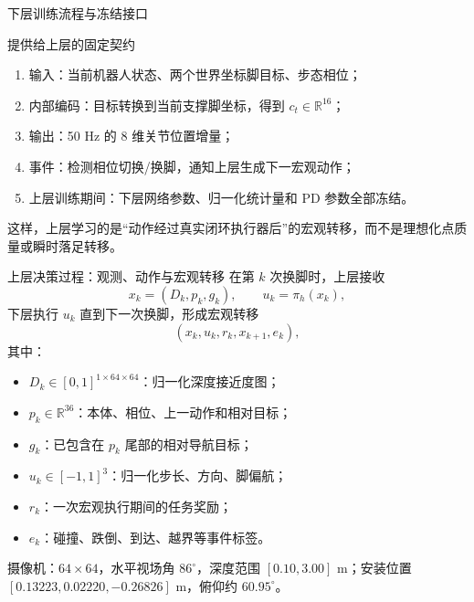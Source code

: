 \documentclass[aspectratio=169,10pt]{beamer}
\begin{document}
\begin{frame}{下层训练流程与冻结接口}
\centering
{}
\vspace{0.8em}
\begin{block}{提供给上层的固定契约}
\begin{enumerate}
  \item 输入：当前机器人状态、两个世界坐标脚目标、步态相位；
  \item 内部编码：目标转换到当前支撑脚坐标，得到 $c_t\in\mathbb{R}^{16}$；
  \item 输出：50 Hz 的 8 维关节位置增量；
  \item 事件：检测相位切换/换脚，通知上层生成下一宏观动作；
  \item 上层训练期间：下层网络参数、归一化统计量和 PD 参数全部冻结。
\end{enumerate}
\end{block}
这样，上层学习的是“动作经过真实闭环执行器后”的宏观转移，而不是理想化点质量或瞬时落足转移。
\end{frame}

\begin{frame}{上层决策过程：观测、动作与宏观转移}
\small
在第 $k$ 次换脚时，上层接收
\[
x_k=(D_k,p_k,g_k),\qquad u_k=\pi_h(x_k),
\]
下层执行 $u_k$ 直到下一次换脚，形成宏观转移
\[
(x_k,u_k,r_k,x_{k+1},e_k),
\]
其中：
\begin{itemize}
  \item $D_k\in[0,1]^{1\times64\times64}$：归一化深度接近度图；
  \item $p_k\in\mathbb{R}^{36}$：本体、相位、上一动作和相对目标；
  \item $g_k$：已包含在 $p_k$ 尾部的相对导航目标；
  \item $u_k\in[-1,1]^3$：归一化步长、方向、脚偏航；
  \item $r_k$：一次宏观执行期间的任务奖励；
  \item $e_k$：碰撞、跌倒、到达、越界等事件标签。
\end{itemize}
摄像机：$64\times64$，水平视场角 $86^\circ$，深度范围 $[0.10,3.00]$ m；安装位置 $[0.13223,0.02220,-0.26826]$ m，俯仰约 $60.95^\circ$。
\end{frame}
\end{document}

